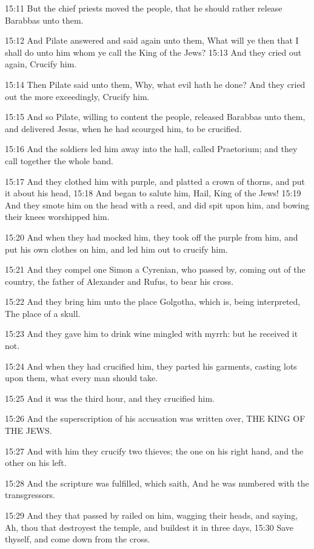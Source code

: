15:11 But the chief priests moved the people, that he should rather release Barabbas unto them.

15:12 And Pilate answered and said again unto them, What will ye then that I shall do unto him whom ye call the King of the Jews?  15:13 And they cried out again, Crucify him.

15:14 Then Pilate said unto them, Why, what evil hath he done? And they cried out the more exceedingly, Crucify him.

15:15 And so Pilate, willing to content the people, released Barabbas unto them, and delivered Jesus, when he had scourged him, to be crucified.

15:16 And the soldiers led him away into the hall, called Praetorium; and they call together the whole band.

15:17 And they clothed him with purple, and platted a crown of thorns, and put it about his head, 15:18 And began to salute him, Hail, King of the Jews!  15:19 And they smote him on the head with a reed, and did spit upon him, and bowing their knees worshipped him.

15:20 And when they had mocked him, they took off the purple from him, and put his own clothes on him, and led him out to crucify him.

15:21 And they compel one Simon a Cyrenian, who passed by, coming out of the country, the father of Alexander and Rufus, to bear his cross.

15:22 And they bring him unto the place Golgotha, which is, being interpreted, The place of a skull.

15:23 And they gave him to drink wine mingled with myrrh: but he received it not.

15:24 And when they had crucified him, they parted his garments, casting lots upon them, what every man should take.

15:25 And it was the third hour, and they crucified him.

15:26 And the superscription of his accusation was written over, THE KING OF THE JEWS.

15:27 And with him they crucify two thieves; the one on his right hand, and the other on his left.

15:28 And the scripture was fulfilled, which saith, And he was numbered with the transgressors.

15:29 And they that passed by railed on him, wagging their heads, and saying, Ah, thou that destroyest the temple, and buildest it in three days, 15:30 Save thyself, and come down from the cross.

